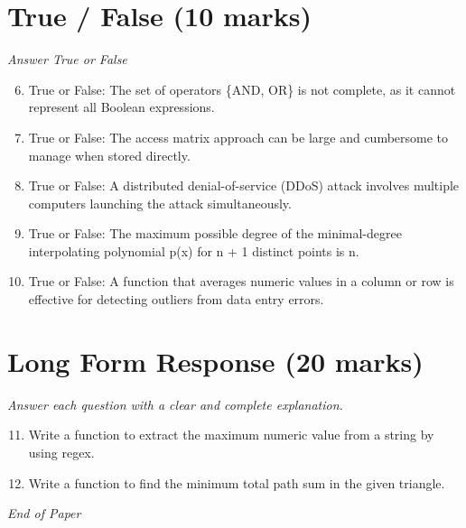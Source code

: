 \documentclass[12pt]{article}
\begin{document}
\section*{True / False (10 marks)}
\textit{Answer True or False}
\begin{enumerate}[label=\arabic*.]
\setcounter{enumi}{5}
\item True or False: The set of operators \{AND, OR\} is not complete, as it cannot represent all Boolean expressions.
\item True or False: The access matrix approach can be large and cumbersome to manage when stored directly.
\item True or False: A distributed denial-of-service (DDoS) attack involves multiple computers launching the attack simultaneously.
\item True or False: The maximum possible degree of the minimal-degree interpolating polynomial p(x) for n + 1 distinct points is n.
\item True or False: A function that averages numeric values in a column or row is effective for detecting outliers from data entry errors.
\end{enumerate}

\section*{Long Form Response (20 marks)}
\textit{Answer each question with a clear and complete explanation.}
\begin{enumerate}[label=\arabic*.]
\setcounter{enumi}{10}
\item Write a function to extract the maximum numeric value from a string by using regex.
\item Write a function to find the minimum total path sum in the given triangle.
\end{enumerate}

\vfill
\noindent\textit{End of Paper}
\end{document}
